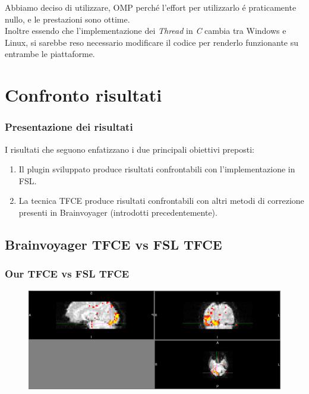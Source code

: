\documentclass{beamer}
\begin{document}
\begin{frame}
Abbiamo deciso di utilizzare, OMP perch\'e l'effort per utilizzarlo \'e praticamente nullo, e le prestazioni sono ottime.\\
\medskip
Inoltre essendo che l'implementazione dei \textit{Thread} in \textit{C} cambia tra Windows e Linux, si sarebbe reso necessario modificare il codice per renderlo funzionante su entrambe le piattaforme.
\end{frame}

\section{Confronto risultati}

\begin{frame}
\frametitle{Presentazione dei risultati}
I risultati che seguono enfatizzano i due principali obiettivi preposti:
\begin{enumerate}
\item Il plugin sviluppato produce risultati confrontabili con l'implementazione in FSL.
\item La tecnica TFCE produce risultati confrontabili con altri metodi di correzione presenti in Brainvoyager (introdotti precedentemente).
\end{enumerate}
\end{frame}

\subsection{Brainvoyager TFCE vs FSL TFCE}
\begin{frame}
\frametitle{Our TFCE vs FSL TFCE}
\begin{figure}
    \centering
        \includegraphics[width=\textwidth]{Images/FSLcorrected.png}
\end{figure}
\end{frame}
\end{document}
